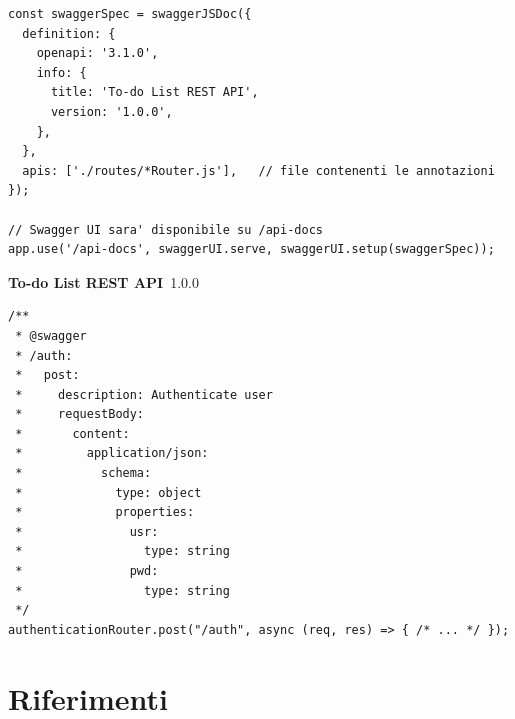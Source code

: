\begin{affianco}[0.58][c]
\codicepiccolo
\begin{lstlisting}[style=js, name=index.js]
const swaggerSpec = swaggerJSDoc({
  definition: {
    openapi: '3.1.0',
    info: {
      title: 'To-do List REST API',
      version: '1.0.0',
    },
  },
  apis: ['./routes/*Router.js'],   // file contenenti le annotazioni
});

// Swagger UI sara' disponibile su /api-docs
app.use('/api-docs', swaggerUI.serve, swaggerUI.setup(swaggerSpec));
\end{lstlisting}
\risultato
\begin{browser}
  {\Lato\bfseries\Large To-do List REST API}\ {\Lato\scriptsize\colorbox{neutral!30!white}{1.0.0}}\\[6pt]
\end{browser}
\end{affianco}

\begin{lstlisting}[style=js, name=routes/authenticationRouter.js]
/**
 * @swagger
 * /auth:
 *   post:
 *     description: Authenticate user
 *     requestBody:
 *       content:
 *         application/json:
 *           schema:
 *             type: object
 *             properties:
 *               usr:
 *                 type: string
 *               pwd:
 *                 type: string
 */
authenticationRouter.post("/auth", async (req, res) => { /* ... */ });
\end{lstlisting}


\section{Riferimenti}

